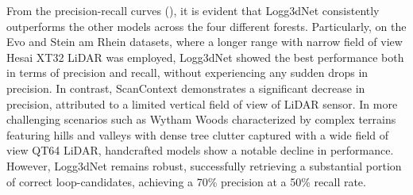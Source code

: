 From the precision-recall curves (), it is evident that Logg3dNet consistently outperforms the other models across the four different forests. Particularly, on the Evo and Stein am Rhein datasets, where a longer range with narrow field of view Hesai XT32 LiDAR was employed, Logg3dNet showed the best performance both in terms of precision and recall, without experiencing any sudden drops in precision.
In contrast, ScanContext demonstrates a significant decrease in precision, attributed to a limited vertical field of view of LiDAR sensor. In more challenging scenarios such as Wytham Woods characterized by complex terrains featuring hills and valleys with dense tree clutter captured with a wide field of view QT64 LiDAR, handcrafted models show a notable decline in performance. However, Logg3dNet remains robust, successfully retrieving a substantial portion of correct loop-candidates, achieving a 70\% precision at a 50\% recall rate. 

